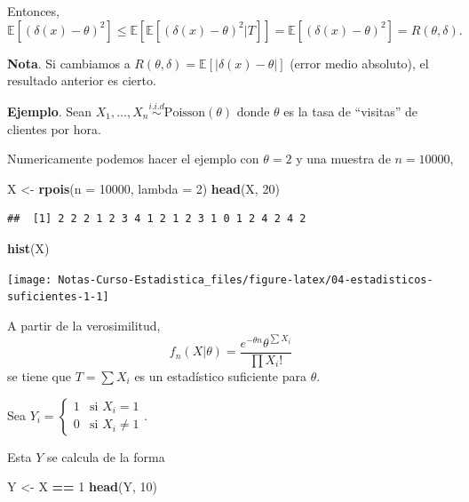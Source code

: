 \documentclass[
  12pt,
]{book}
\newenvironment{Shaded}{\begin{snugshade}}{\end{snugshade}}
\newcommand{\DataTypeTok}[1]{\textcolor[rgb]{0.13,0.29,0.53}{#1}}
\newcommand{\DecValTok}[1]{\textcolor[rgb]{0.00,0.00,0.81}{#1}}
\newcommand{\KeywordTok}[1]{\textcolor[rgb]{0.13,0.29,0.53}{\textbf{#1}}}
\newcommand{\NormalTok}[1]{#1}
\newcommand{\OperatorTok}[1]{\textcolor[rgb]{0.81,0.36,0.00}{\textbf{#1}}}
\newcommand{\StringTok}[1]{\textcolor[rgb]{0.31,0.60,0.02}{#1}}
\begin{document}
Entonces,
\[ \mathbb E[(\delta(x)-\theta)^2] \leq \mathbb E[\mathbb E[(\delta(x)-\theta)^2|T]] = \mathbb E[(\delta(x)-\theta)^2] = R(\theta,\delta).\]

\textbf{Nota}. Si cambiamos a \(R(\theta,\delta) = \mathbb E[|\delta(x)-\theta|]\) (error medio absoluto), el resultado anterior es cierto.

\textbf{Ejemplo}. Sean \(X_1,\dots, X_n \stackrel{i.i.d}{\sim} \text{Poisson}(\theta)\) donde \(\theta\) es la tasa de ``visitas'' de clientes por hora.

Numericamente podemos hacer el ejemplo con \(\theta = 2\) y una muestra de \(n = 10000\),

\begin{Shaded}
\begin{Highlighting}[]
\NormalTok{X \textless{}{-}}\StringTok{ }\KeywordTok{rpois}\NormalTok{(}\DataTypeTok{n =} \DecValTok{10000}\NormalTok{, }\DataTypeTok{lambda =} \DecValTok{2}\NormalTok{)}
\KeywordTok{head}\NormalTok{(X, }\DecValTok{20}\NormalTok{)}
\end{Highlighting}
\end{Shaded}

\begin{verbatim}
##  [1] 2 2 2 1 2 3 4 1 2 1 2 3 1 0 1 2 4 2 4 2
\end{verbatim}

\begin{Shaded}
\begin{Highlighting}[]
\KeywordTok{hist}\NormalTok{(X)}
\end{Highlighting}
\end{Shaded}

\begin{center}\texttt{[image: Notas-Curso-Estadistica\_files/figure-latex/04-estadisticos-suficientes-1-1]} \end{center}

A partir de la verosimilitud,
\[f_n(X|\theta) = \dfrac{e^{-\theta n} \theta^{\sum X_i}}{\prod X_i!} \]
se tiene que \(T=\sum X_i\) es un estadístico suficiente para \(\theta\).

Sea \(Y_i = \begin{cases} 1 & \text{si } X_i = 1\\ 0 & \text{si } X_i \ne 1\end{cases}\).

Esta \(Y\) se calcula de la forma

\begin{Shaded}
\begin{Highlighting}[]
\NormalTok{Y \textless{}{-}}\StringTok{ }\NormalTok{X }\OperatorTok{==}\StringTok{ }\DecValTok{1}
\KeywordTok{head}\NormalTok{(Y, }\DecValTok{10}\NormalTok{)}
\end{Highlighting}
\end{Shaded}
\end{document}

